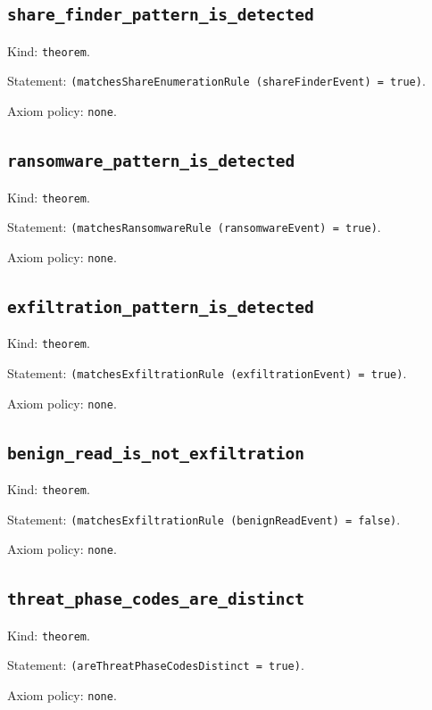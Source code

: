 \documentclass[11pt]{article}
\begin{document}
\subsection*{\texttt{share\_finder\_pattern\_is\_detected}}
\noindent Kind: \texttt{theorem}.\par
\noindent Statement: \texttt{(matchesShareEnumerationRule (shareFinderEvent) = true)}.\par
\noindent Axiom policy: \texttt{none}.\par
\subsection*{\texttt{ransomware\_pattern\_is\_detected}}
\noindent Kind: \texttt{theorem}.\par
\noindent Statement: \texttt{(matchesRansomwareRule (ransomwareEvent) = true)}.\par
\noindent Axiom policy: \texttt{none}.\par
\subsection*{\texttt{exfiltration\_pattern\_is\_detected}}
\noindent Kind: \texttt{theorem}.\par
\noindent Statement: \texttt{(matchesExfiltrationRule (exfiltrationEvent) = true)}.\par
\noindent Axiom policy: \texttt{none}.\par
\subsection*{\texttt{benign\_read\_is\_not\_exfiltration}}
\noindent Kind: \texttt{theorem}.\par
\noindent Statement: \texttt{(matchesExfiltrationRule (benignReadEvent) = false)}.\par
\noindent Axiom policy: \texttt{none}.\par
\subsection*{\texttt{threat\_phase\_codes\_are\_distinct}}
\noindent Kind: \texttt{theorem}.\par
\noindent Statement: \texttt{(areThreatPhaseCodesDistinct = true)}.\par
\noindent Axiom policy: \texttt{none}.\par
\end{document}
